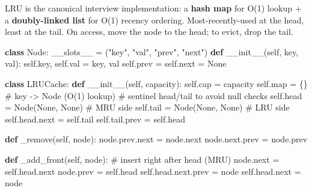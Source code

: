 \documentclass[11pt]{article}
\newenvironment{Shaded}{\begin{snugshade}}{\end{snugshade}}
\newcommand{\BuiltInTok}[1]{\textcolor[rgb]{0.50,0.55,0.55}{#1}}
\newcommand{\CommentTok}[1]{\textcolor[rgb]{0.48,0.49,0.49}{#1}}
\newcommand{\FunctionTok}[1]{\textcolor[rgb]{0.56,0.27,0.68}{#1}}
\newcommand{\KeywordTok}[1]{\textcolor[rgb]{0.81,0.81,0.76}{\textbf{#1}}}
\newcommand{\NormalTok}[1]{\textcolor[rgb]{0.81,0.81,0.76}{#1}}
\newcommand{\OperatorTok}[1]{\textcolor[rgb]{0.81,0.81,0.76}{#1}}
\newcommand{\StringTok}[1]{\textcolor[rgb]{0.96,0.31,0.31}{#1}}
\newcommand{\VariableTok}[1]{\textcolor[rgb]{0.15,0.68,0.68}{#1}}
\begin{document}
LRU is the canonical interview implementation: a \textbf{hash map} for O(1) lookup + a \textbf{doubly-linked list} for O(1) recency ordering. Most-recently-used at the head, least at the tail. On access, move the node to the head; to evict, drop the tail.


\begin{Shaded}
\begin{Highlighting}[]
\KeywordTok{class}\NormalTok{ Node:}
    \FunctionTok{\_\_slots\_\_} \OperatorTok{=}\NormalTok{ (}\StringTok{"key"}\NormalTok{, }\StringTok{"val"}\NormalTok{, }\StringTok{"prev"}\NormalTok{, }\StringTok{"next"}\NormalTok{)}
    \KeywordTok{def} \FunctionTok{\_\_init\_\_}\NormalTok{(}\VariableTok{self}\NormalTok{, key, val):}
        \VariableTok{self}\NormalTok{.key, }\VariableTok{self}\NormalTok{.val }\OperatorTok{=}\NormalTok{ key, val}
        \VariableTok{self}\NormalTok{.prev }\OperatorTok{=} \VariableTok{self}\NormalTok{.}\BuiltInTok{next} \OperatorTok{=} \VariableTok{None}

\KeywordTok{class}\NormalTok{ LRUCache:}
    \KeywordTok{def} \FunctionTok{\_\_init\_\_}\NormalTok{(}\VariableTok{self}\NormalTok{, capacity):}
        \VariableTok{self}\NormalTok{.cap }\OperatorTok{=}\NormalTok{ capacity}
        \VariableTok{self}\NormalTok{.}\BuiltInTok{map} \OperatorTok{=}\NormalTok{ \{\}                 }\CommentTok{\# key {-}\textgreater{} Node  (O(1) lookup)}
        \CommentTok{\# sentinel head/tail to avoid null checks}
        \VariableTok{self}\NormalTok{.head }\OperatorTok{=}\NormalTok{ Node(}\VariableTok{None}\NormalTok{, }\VariableTok{None}\NormalTok{)  }\CommentTok{\# MRU side}
        \VariableTok{self}\NormalTok{.tail }\OperatorTok{=}\NormalTok{ Node(}\VariableTok{None}\NormalTok{, }\VariableTok{None}\NormalTok{)  }\CommentTok{\# LRU side}
        \VariableTok{self}\NormalTok{.head.}\BuiltInTok{next} \OperatorTok{=} \VariableTok{self}\NormalTok{.tail}
        \VariableTok{self}\NormalTok{.tail.prev }\OperatorTok{=} \VariableTok{self}\NormalTok{.head}

    \KeywordTok{def}\NormalTok{ \_remove(}\VariableTok{self}\NormalTok{, node):}
\NormalTok{        node.prev.}\BuiltInTok{next} \OperatorTok{=}\NormalTok{ node.}\BuiltInTok{next}
\NormalTok{        node.}\BuiltInTok{next}\NormalTok{.prev }\OperatorTok{=}\NormalTok{ node.prev}

    \KeywordTok{def}\NormalTok{ \_add\_front(}\VariableTok{self}\NormalTok{, node):       }\CommentTok{\# insert right after head (MRU)}
\NormalTok{        node.}\BuiltInTok{next} \OperatorTok{=} \VariableTok{self}\NormalTok{.head.}\BuiltInTok{next}
\NormalTok{        node.prev }\OperatorTok{=} \VariableTok{self}\NormalTok{.head}
        \VariableTok{self}\NormalTok{.head.}\BuiltInTok{next}\NormalTok{.prev }\OperatorTok{=}\NormalTok{ node}
        \VariableTok{self}\NormalTok{.head.}\BuiltInTok{next} \OperatorTok{=}\NormalTok{ node}


\end{Highlighting}
\end{Shaded}
\end{document}
